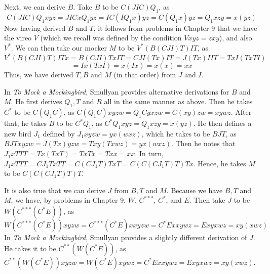 \documentclass{article}
\theoremstyle{definition}
\begin{document}
Next, we can derive $B$. Take $B$ to be $C(JIC)Q_1$, as \[ C(JIC)Q_1xyz=JICxQ_1yz=IC(IQ_1x)yz=C(Q_1x)yz=Q_1xzy=x(yz) \]
Now having derived $B$ and $T$, it follows from problems in Chapter 9 that we have the vireo $V$ (which we recall was defined by the condition $Vxyz=zxy$), 
and also $V^*$. We can then take our mocker $M$ to be 
$V^*(B(CJI)T)IT$, as \[ V^*(B(CJI)T)ITx=B(CJI)TxIT=CJI(Tx)IT=J(Tx)IIT=TxI(TxTI) \] \[ =Ix(TxI)=x(Ix)=x(x)=xx \]
Thus, we have derived $T,B$ and $M$ (in that order) from $J$ and $I$.


In \textit{To Mock a Mockingbird}, Smullyan provides alternative derivations for $B$ and $M$. He first derives $Q_1,T$ and $R$ all in the same manner as above. Then he 
takes $C^*$ to be $C(Q_1C)$, as $C(Q_1C)xyzw=Q_1Cyxzw=C(xy)zw=xywz$. After that, he takes $B$ to be $C^*Q_1$, as 
$C^*Q_1xyz=Q_1xzy=x(yz)$. He then defines a new bird $J_1$ defined by $J_1xyzw=yx(wxz)$, which he takes to be $BJT$, as
$BJTxyzw=J(Tx)yzw=Txy(Txwz)=yx(wxz)$. Then he notes that $J_1xTTT=Tx(TxT)=TxTx=Txx=xx$. In turn,
$J_1xTTT=CJ_1TxTT=C(CJ_1T)TxT=C(C(CJ_1T)T)Tx$. Hence, he takes $M$ to be $C(C(CJ_1T)T)T$. 


It is also true that we can derive $J$ from $B,T$ and $M$. Because we have $B,T$ and $M$, we have, by problems in Chapter 9, $W$, $C^{***}$, $C^*$, and $E$. 
Then take $J$ to be $W(C^{***}(C^*E))$, as \[ W(C^{***}(C^*E))xyzw=C^{***}(C^*E)xxyzw=C^*Exxywz=Exyxwz=xy(xwz) \] In \textit{To Mock a Mockingbird}, Smullyan 
provides a slightly different derivation of $J$. He takes it to be $C^{**}(W(C^*E))$, as
$C^{**}(W(C^*E))xyzw=W(C^*E)xywz=C^*Exxywz=Exyxwz=xy(xwz)$.
\end{document}
